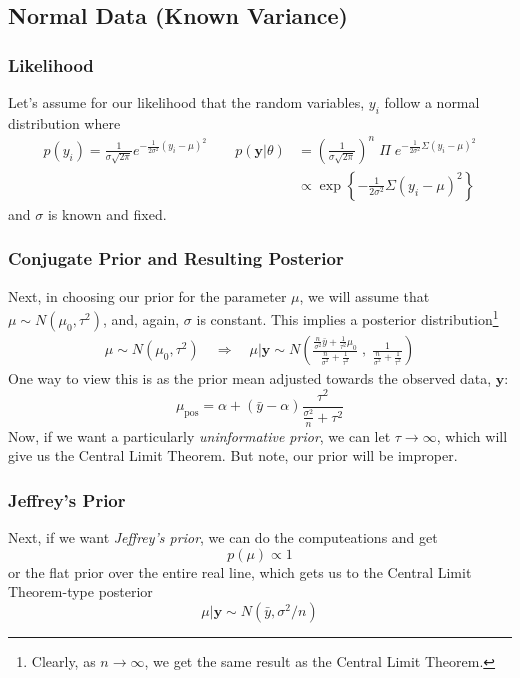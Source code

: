\documentclass[a4paper,12pt]{scrartcl}
\begin{document}
\newpage

\subsection{Normal Data (Known Variance)}

\subsubsection{Likelihood}
Let's assume for our likelihood that the random variables, $y_i$
follow a normal distribution where
\begin{align*}
    p(y_i) = \frac{1}{\sigma \sqrt{2\pi}} e^{-\frac{1}{2\sigma^2}
    (y_i - \mu)^2} \qquad p(\mathbf{y} | \theta) &= \left(\frac{1}{  
       \sigma \sqrt{2\pi}}\right)^n \; \Pi \; e^{-\frac{1}{2\sigma^2}
       \Sigma (y_i - \mu)^2}
   \\
   &\propto \exp\left\{ -\frac{1}{2\sigma^2}
      \Sigma (y_i - \mu)^2 \right\}
\end{align*}
and $\sigma$ is known and fixed.  


\subsubsection{Conjugate Prior and Resulting Posterior}
Next, in choosing our prior for the parameter $\mu$, we will assume
that $\mu \sim N(\mu_0, \tau^2)$, and, again, $\sigma$ is constant. 
This implies a posterior distribution\footnote{
Clearly, as $n\rightarrow \infty$, we get the same result as the Central
Limit Theorem.}
\begin{align*}
   \mu \sim N(\mu_0, \tau^2) \quad \Rightarrow \quad
   \mu | \mathbf{y} \sim N\left( \frac{\frac{n}{\sigma^2} \bar{y}
   + \frac{1}{\tau^2} \mu_0}{\frac{n}{\sigma^2} + \frac{1}{\tau^2}}
   \; , \; \frac{1}{\frac{n}{\sigma^2} + \frac{1}{\tau^2}} \right)
\end{align*}
One way to view this is as the prior mean adjusted towards
the observed data, $\mathbf{y}$:
\[ \mu_{\text{pos}} = \alpha + (\bar{y} - \alpha) 
   \frac{\tau^2}{\frac{\sigma^2}{n} + \tau^2} \]
Now, if we want a particularly \emph{uninformative prior}, we can 
let $\tau \rightarrow \infty$, which will give us the Central Limit
Theorem. But note, our prior will be improper.

\subsubsection{Jeffrey's Prior}
Next, if we want \emph{Jeffrey's prior}, 
we can do the computeations and get
   \[ p(\mu) \propto 1 \]
or the flat prior over the entire real line, which gets us to the
Central Limit Theorem-type posterior
   \[ \mu | \mathbf{y} \sim N(\bar{y}, \sigma^2/n) \]
\end{document}
